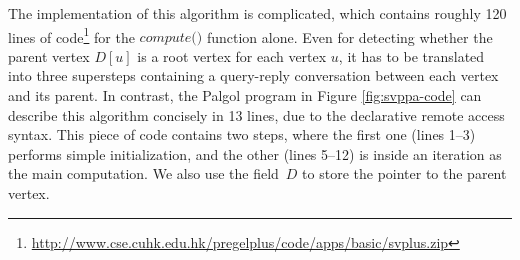 \documentclass{sokendai_thesis} %
\begin{document}

The implementation of this algorithm is complicated, which contains roughly 120 lines of code\footnote{\url{http://www.cse.cuhk.edu.hk/pregelplus/code/apps/basic/svplus.zip}} for the $\textit{compute()}$ function alone.
Even for detecting whether the parent vertex $D[u]$ is a root vertex for each vertex $u$, it has to be translated into three supersteps containing a query-reply conversation between each vertex and its parent.
In contrast, the Palgol program in Figure \ref{fig:svppa-code} can describe this algorithm concisely in 13 lines, due to the declarative remote access syntax.
This piece of code contains two steps, where the first one (lines 1--3) performs simple initialization, and the other (lines 5--12) is inside an iteration as the main computation.
We also use the field~$D$ to store the pointer to the parent vertex.
\end{document}
